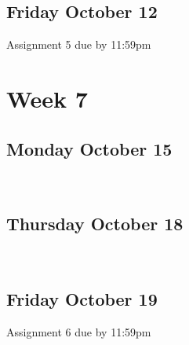 \documentclass[]{book}
\let\originaltabular\tabular
\let\endoriginaltabular\endtabular
\renewenvironment{tabular}[1]{%
  \begingroup%
  \centering%
  \originaltabular{#1}}%
  {\endoriginaltabular\endgroup}
\theoremstyle{definition}
\theoremstyle{definition}
\theoremstyle{definition}
\theoremstyle{remark}
\begin{document}
\subsection{Friday October 12}\label{friday-october-12}

\begin{table}[H]
\centering
\begin{tabular}{l}
\hline
Assignment 5 due by 11:59pm\\
\hline
\end{tabular}
\end{table}

\section{Week 7}\label{week-7}

\subsection{Monday October 15}\label{monday-october-15}

\begin{table}[H]
\centering
\begin{tabular}{l}
\hline
\\
\hline
\end{tabular}
\end{table}

\subsection{Thursday October 18}\label{thursday-october-18}

\begin{table}[H]
\centering
\begin{tabular}{l}
\hline
\\
\hline
\end{tabular}
\end{table}

\subsection{Friday October 19}\label{friday-october-19}

\begin{table}[H]
\centering
\begin{tabular}{l}
\hline
Assignment 6 due by 11:59pm\\
\hline
\end{tabular}
\end{table}
\end{document}
